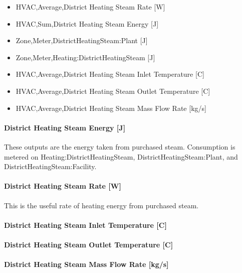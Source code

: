 \begin{itemize}
    \item
    HVAC,Average,District Heating Steam Rate {[}W{]}
    \item
    HVAC,Sum,District Heating Steam Energy {[}J{]}
    \item
    Zone,Meter,DistrictHeatingSteam:Plant {[}J{]}
    \item
    Zone,Meter,Heating:DistrictHeatingSteam {[}J{]}
    \item
    HVAC,Average,District Heating Steam Inlet Temperature {[}C{]}
    \item
    HVAC,Average,District Heating Steam Outlet Temperature {[}C{]}
    \item
    HVAC,Average,District Heating Steam Mass Flow Rate {[}kg/s{]}
\end{itemize}

\paragraph{District Heating Steam Energy {[}J{]}}\label{district-heating-Steam-energy-j}

These outputs are the energy taken from purchased steam. Consumption is metered on Heating:DistrictHeatingSteam, DistrictHeatingSteam:Plant, and DistrictHeatingSteam:Facility.

\paragraph{District Heating Steam Rate {[}W{]}}\label{district-heating-steam-rate-w}

This is the useful rate of heating energy from purchased steam.

\paragraph{District Heating Steam Inlet Temperature {[}C{]}}\label{district-heating-steam-inlet-temperature-c}

\paragraph{District Heating Steam Outlet Temperature {[}C{]}}\label{district-heating-steam-outlet-temperature-c}

\paragraph{District Heating Steam Mass Flow Rate {[}kg/s{]}}\label{district-heating-steam-mass-flow-rate-kgs}

